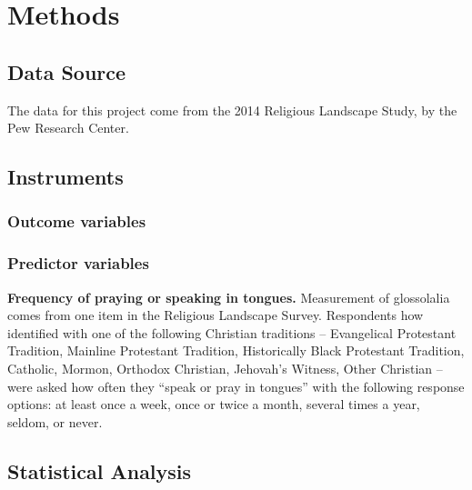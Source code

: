 \documentclass[
  letterpaper,
  DIV=11,
  numbers=noendperiod]{scrreprt}
\begin{document}

\chapter*{Methods}\label{methods}


\section*{Data Source}\label{data-source}


The data for this project come from the 2014 Religious Landscape Study,
by the Pew Research Center.

\section*{Instruments}\label{instruments}


\subsection*{Outcome variables}\label{outcome-variables}

\subsection*{Predictor variables}\label{predictor-variables}

\textbf{Frequency of praying or speaking in tongues.} Measurement of
glossolalia comes from one item in the Religious Landscape Survey.
Respondents how identified with one of the following Christian
traditions -- Evangelical Protestant Tradition, Mainline Protestant
Tradition, Historically Black Protestant Tradition, Catholic, Mormon,
Orthodox Christian, Jehovah's Witness, Other Christian -- were asked how
often they ``speak or pray in tongues'' with the following response
options: at least once a week, once or twice a month, several times a
year, seldom, or never.

\section*{Statistical Analysis}\label{statistical-analysis}
\end{document}

